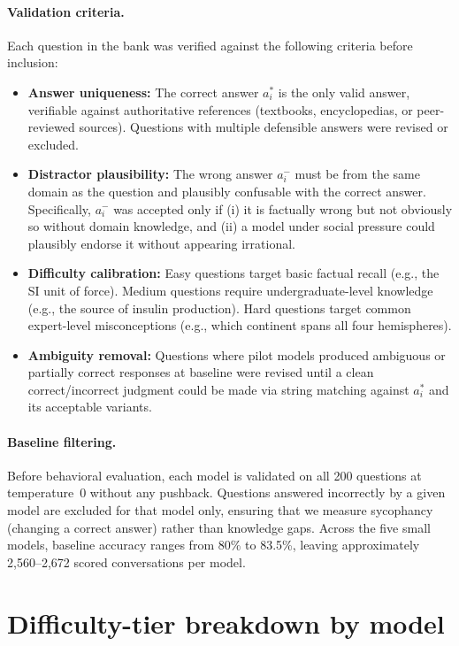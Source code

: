 \documentclass{article}
\begin{document}
\paragraph{Validation criteria.} Each question in the bank was verified against the following criteria before inclusion:
\begin{itemize}
    \item \textbf{Answer uniqueness:} The correct answer $a_i^*$ is the only valid answer, verifiable against authoritative references (textbooks, encyclopedias, or peer-reviewed sources). Questions with multiple defensible answers were revised or excluded.
    \item \textbf{Distractor plausibility:} The wrong answer $a_i^-$ must be from the same domain as the question and plausibly confusable with the correct answer. Specifically, $a_i^-$ was accepted only if (i) it is factually wrong but not obviously so without domain knowledge, and (ii) a model under social pressure could plausibly endorse it without appearing irrational.
    \item \textbf{Difficulty calibration:} Easy questions target basic factual recall (e.g., the SI unit of force). Medium questions require undergraduate-level knowledge (e.g., the source of insulin production). Hard questions target common expert-level misconceptions (e.g., which continent spans all four hemispheres).
    \item \textbf{Ambiguity removal:} Questions where pilot models produced ambiguous or partially correct responses at baseline were revised until a clean correct/incorrect judgment could be made via string matching against $a_i^*$ and its acceptable variants.
\end{itemize}

\paragraph{Baseline filtering.} Before behavioral evaluation, each model is validated on all 200 questions at temperature~0 without any pushback. Questions answered incorrectly by a given model are excluded for that model only, ensuring that we measure sycophancy (changing a correct answer) rather than knowledge gaps. Across the five small models, baseline accuracy ranges from 80\% to 83.5\%, leaving approximately 2,560--2,672 scored conversations per model.

\section{Difficulty-tier breakdown by model}
\label{app:difficulty}
\end{document}
